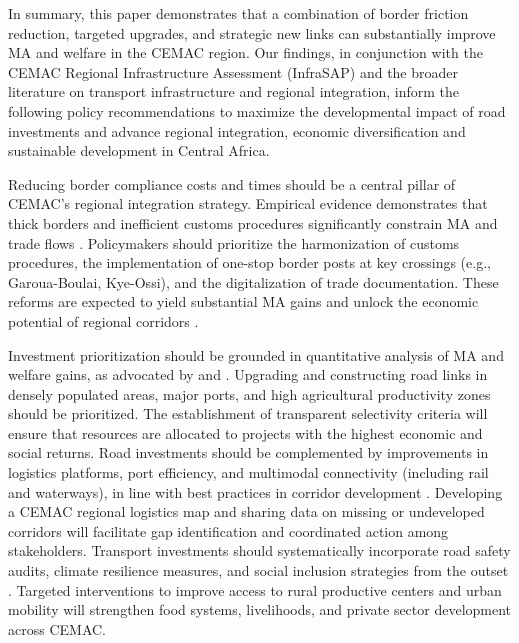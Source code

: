 \documentclass[a4paper]{article}
\begin{document}

In summary, this paper demonstrates that a combination of border friction reduction, targeted upgrades, and strategic new links can substantially improve MA and welfare in the CEMAC region. Our findings, in conjunction with the CEMAC Regional Infrastructure Assessment (InfraSAP) and the broader literature on transport infrastructure and regional integration, inform the following policy recommendations to maximize the developmental impact of road investments and advance regional integration, economic diversification and sustainable development in Central Africa. \newline 

Reducing border compliance costs and times should be a central pillar of CEMAC’s regional integration strategy. Empirical evidence demonstrates that thick borders and inefficient customs procedures significantly constrain MA and trade flows \citep{LPI2023, fontagne2023trade}. Policymakers should prioritize the harmonization of customs procedures, the implementation of one-stop border posts at key crossings (e.g., Garoua-Boulai, Kye-Ossi), and the digitalization of trade documentation. These reforms are expected to yield substantial MA gains and unlock the economic potential of regional corridors \citep{Kunaka2025TransportConnectivity, herrera2024shrinking}. \newline 

Investment prioritization should be grounded in quantitative analysis of MA and welfare gains, as advocated by \citet{FajgelbaumGaubert2025Optimal} and \citep{krantz2024optimal}. Upgrading and constructing road links in densely populated areas, major ports, and high agricultural productivity zones should be prioritized. The establishment of transparent selectivity criteria will ensure that resources are allocated to projects with the highest economic and social returns. Road investments should be complemented by improvements in logistics platforms, port efficiency, and multimodal connectivity (including rail and waterways), in line with best practices in corridor development \citep{WorldBank2025_ContainerPortindex}. Developing a CEMAC regional logistics map and sharing data on missing or undeveloped corridors will facilitate gap identification and coordinated action among stakeholders.  
Transport investments should systematically incorporate road safety audits, climate resilience measures, and social inclusion strategies from the outset \citep{AfDB2022_AfricanEconomicOutlook}. Targeted interventions to improve access to rural productive centers and urban mobility will strengthen food systems, livelihoods, and private sector development across CEMAC. \newline 
\end{document}
